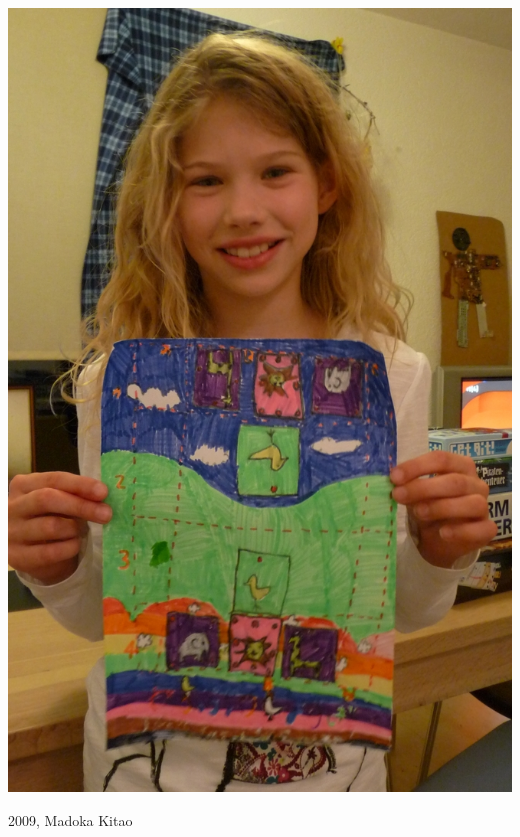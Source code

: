\documentclass{beamer}
\begin{document}
\begin{frame}
\begin{center}
\includegraphics[scale = 0.3]{kid.jpg}

\end{center}
2009, Madoka Kitao
\end{frame}
\end{document}
